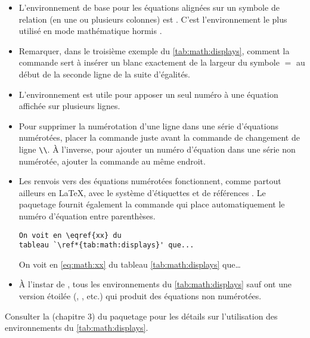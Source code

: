 \begin{itemize}
\item L'environnement de base pour les équations alignées sur un
  symbole de relation (en une ou plusieurs colonnes) est .
  C'est l'environnement le plus utilisé en mode mathématique hormis
  .
\item Remarquer, dans le troisième exemple du
  \autoref{tab:math:displays}, comment la commande \cmd{\phantom} sert
  à insérer un blanc exactement de la largeur du symbole $=$ au début
  de la seconde ligne de la suite d'égalités.
\item L'environnement  est utile pour apposer un seul numéro
  à une équation affichée sur plusieurs lignes.
\item Pour supprimer la numérotation d'une ligne dans une série
  d'équations numérotées, placer la commande \cmd{\notag} juste avant
  la commande de changement de ligne \verb=\\=. À l'inverse, pour
  ajouter un numéro d'équation dans une série non numérotée, ajouter
  la commande \cmd{\tag} au même endroit.
\item Les renvois vers des équations numérotées fonctionnent, comme
  partout ailleurs en {\LaTeX}, avec le système d'étiquettes et de
  références \citep{UL:latex:1,sec:tableaux:floats}. Le paquetage
   fournit également la commande \cmd{\eqref} qui place
  automatiquement le numéro d'équation entre parenthèses.
  \begin{demo}
    \begin{texample}
\begin{lstlisting}
On voit en \eqref{xx} du
tableau `\ref*{tab:math:displays}' que...
\end{lstlisting}
      \producing
      On voit en \eqref{eq:math:xx} du tableau
      \ref*{tab:math:displays} que\dots
    \end{texample}
  \end{demo}
\item À l'instar de , tous les environnements du
  \autoref{tab:math:displays} sauf  ont une version étoilée
  (, , etc.) qui produit des
  équations non numérotées.
\end{itemize}
Consulter la %
(chapitre 3) du paquetage  pour les détails sur
l'utilisation des environnements du \autoref*{tab:math:displays}.

